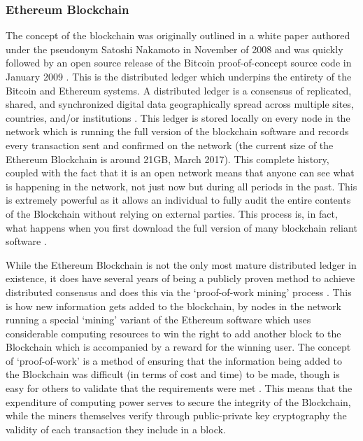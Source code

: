 \documentclass{article}
\begin{document}
\cleardoublepage
\subsubsection{Ethereum Blockchain}
The concept of the blockchain was originally outlined in a white paper \citep{12_nakamoto_2008} authored under the pseudonym Satoshi Nakamoto in November of 2008 and was quickly followed by an open source release of the Bitcoin proof-of-concept source code in January 2009 \citep{13_nakamoto_2009}. This is the distributed ledger which underpins the entirety of the Bitcoin and Ethereum systems. A distributed ledger is a consensus of replicated, shared, and synchronized digital data geographically spread across multiple sites, countries, and/or institutions \citep{24_distributed_ledgers_and_blockchain_technology_2016}. This ledger is stored locally on every node in the network which is running the full version of the blockchain software \citep{14_bitcoin_2009} and records every transaction sent and confirmed on the network (the current size of the Ethereum Blockchain is around 21GB, March 2017\citep{25_blockchain_size_2016}). This complete history, coupled with the fact that it is an open network means that anyone can see what is happening in the network, not just now but during all periods in the past. This is extremely powerful as it allows an individual to fully audit the entire contents of the Blockchain without relying on external parties. This process is, in fact, what happens when you first download the full version of many blockchain reliant software \citep{20_developer_guide_bitcoin_2016}.

While the Ethereum Blockchain is not the only most mature distributed ledger in existence, it does have several years of being a publicly proven method to achieve distributed consensus and does this via the `proof-of-work mining' process \citep{24_distributed_ledgers_and_blockchain_technology_2016}. This is how new information gets added to the blockchain, by nodes in the network running a special `mining' variant of the Ethereum software which uses considerable computing resources to win the right to add another block to the Blockchain which is accompanied by a reward for the winning user. The concept of `proof-of-work' is a method of ensuring that the information being added to the Blockchain was difficult (in terms of cost and time) to be made, though is easy for others to validate that the requirements were met \citep{26_blockchain_mining_-_distributed_ledgers_and_blockchain_technology_2016}. This means that the expenditure of computing power serves to secure the integrity of the Blockchain, while the miners themselves verify through public-private key cryptography the validity of each transaction they include in a block.
\end{document}
